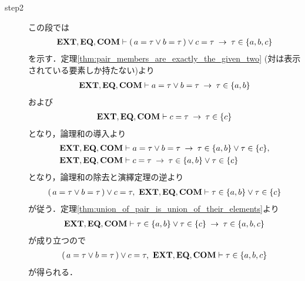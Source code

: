 \begin{sketch}
\begin{description}
			\item[step2]
				この段では
				\begin{align}
					\mbox{{\bf EXT}},\mbox{{\bf EQ}},\mbox{\bf COM} \vdash 
					(\, a = \tau \vee b = \tau\, ) \vee c = \tau \hspace{0.25em}\rightarrow\hspace{0.25em} 
					\tau \in \{a,b,c\}
				\end{align}
				を示す．定理\ref{thm:pair_members_are_exactly_the_given_two}
				(対は表示されている要素しか持たない)より
				\begin{align}
					\mbox{{\bf EXT}},\mbox{{\bf EQ}},\mbox{\bf COM} \vdash a = \tau \vee b = \tau 
					\hspace{0.25em}\rightarrow\hspace{0.25em} \tau \in \{a,b\}
				\end{align}
				および
				\begin{align}
					\mbox{{\bf EXT}},\mbox{{\bf EQ}},\mbox{\bf COM} \vdash c = \tau
					\hspace{0.25em}\rightarrow\hspace{0.25em} \tau \in \{c\}
				\end{align}
				となり，論理和の導入より
				\begin{align}
					\mbox{{\bf EXT}},\mbox{{\bf EQ}},\mbox{\bf COM} &\vdash a = \tau \vee b = \tau 
					\hspace{0.25em}\rightarrow\hspace{0.25em} \tau \in \{a,b\} \vee \tau \in \{c\}, \\
					\mbox{{\bf EXT}},\mbox{{\bf EQ}},\mbox{\bf COM} &\vdash c = \tau 
					\hspace{0.25em}\rightarrow\hspace{0.25em} \tau \in \{a,b\} \vee \tau \in \{c\}
				\end{align}
				となり，論理和の除去と演繹定理の逆より
				\begin{align}
					(\, a = \tau \vee b = \tau\, ) \vee c = \tau,\ 
					\EXTAX,\EQAX,\COMAX \vdash \tau \in \{a,b\} \vee \tau \in \{c\}
				\end{align}
				が従う．定理\ref{thm:union_of_pair_is_union_of_their_elements}より
				\begin{align}
					\mbox{{\bf EXT}},\mbox{{\bf EQ}},\mbox{\bf COM} \vdash 
					\tau \in \{a,b\} \vee \tau \in \{c\} 
					\hspace{0.25em}\rightarrow\hspace{0.25em} \tau \in \{a,b,c\}
				\end{align}
				が成り立つので
				\begin{align}
					(\, a = \tau \vee b = \tau\, ) \vee c = \tau,\ 
					\EXTAX,\EQAX,\COMAX \vdash \tau \in \{a,b,c\}
				\end{align}
				が得られる．
				\QED
		\end{description}
	\end{sketch}
	

